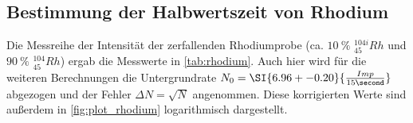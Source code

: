\subsection{Bestimmung der Halbwertszeit von Rhodium}
\label{ssec:auswertung_rhodium}

Die Messreihe der Intensität der zerfallenden Rhodiumprobe (ca. $\SI{10}{\percent}$ $ ^{104i}_{45}Rh$ und $\SI{90}{\percent}$ $ ^{104}_{45}Rh$) ergab die Messwerte in \autoref{tab:rhodium}.
Auch hier wird für die weiteren Berechnungen die Untergrundrate $N_0=\SI{6.96+-0.20}{\frac{Imp}{15\second}}$ abgezogen und der Fehler $\Delta N = \sqrt{N}$ angenommen.
Diese korrigierten Werte sind außerdem in \autoref{fig:plot_rhodium} logarithmisch dargestellt.

\begin{table}
    \centering
    \caption{Messergebnisse für die Rhodiumprobe}
\end{table}

